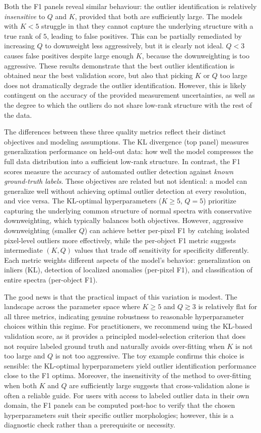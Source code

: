 \documentclass[onecolumn,floatfix,linenumbers,trackchanges]{aastex631}
\begin{document}
Both the F1 panels reveal similar behaviour: the outlier identification is relatively \emph{insensitive} to $Q$ and $K$, provided that both are sufficiently large.
The models with $K<5$ struggle in that they cannot capture the underlying structure with a true rank of $5$, leading to false positives.
This can be partially remediated by increasing $Q$ to downweight less aggressively, but it is clearly not ideal.
$Q<3$ causes false positives despite large enough $K$, because the downweighting is too aggressive.
These results demonstrate that the best outlier identification is obtained near the best validation score, but also that picking $K$ or $Q$ too large does not dramatically degrade the outlier identification.
However, this is likely contingent on the accuracy of the provided measurement uncertainties, as well as the degree to which the outliers do not share low-rank structure with the rest of the data.

The differences between these three quality metrics reflect their distinct objectives and modeling assumptions. The KL divergence (top panel) measures generalization performance on held-out data: how well the model compresses the full data distribution into a sufficient low-rank structure. In contrast, the F1 scores measure the accuracy of automated outlier detection against \emph{known ground-truth labels}. These objectives are related but not identical: a model can generalize well without achieving optimal outlier detection at every resolution, and vice versa. The KL-optimal hyperparameters ($K \geq 5$, $Q=5$) prioritize capturing the underlying common structure of normal spectra with conservative downweighting, which typically balances both objectives. However, aggressive downweighting (smaller $Q$) can achieve better per-pixel F1 by catching isolated pixel-level outliers more effectively, while the per-object F1 metric suggests intermediate $(K, Q)$ values that trade off sensitivity for specificity differently. Each metric weights different aspects of the model's behavior: generalization on inliers (KL), detection of localized anomalies (per-pixel F1), and classification of entire spectra (per-object F1).

The good news is that the practical impact of this variation is modest. The landscape across the parameter space where $K \geq 5$ and $Q \gtrsim 3$ is relatively flat for all three metrics, indicating genuine robustness to reasonable hyperparameter choices within this regime. For practitioners, we recommend using the KL-based validation score, as it provides a principled model-selection criterion that does not require labeled ground truth and naturally avoids over-fitting when $K$ is not too large and $Q$ is not too aggressive. The toy example confirms this choice is sensible: the KL-optimal hyperparameters yield outlier identification performance close to the F1 optima. Moreover, the insensitivity of the method to over-fitting when both $K$ and $Q$ are sufficiently large suggests that cross-validation alone is often a reliable guide. For users with access to labeled outlier data in their own domain, the F1 panels can be computed post-hoc to verify that the chosen hyperparameters suit their specific outlier morphologies; however, this is a diagnostic check rather than a prerequisite or necessity.
\end{document}
